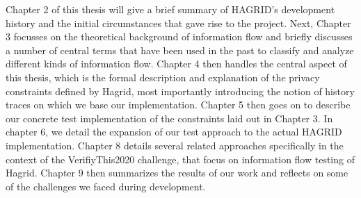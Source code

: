 Chapter 2 of this thesis will give a brief summary of HAGRID's development history and the initial circumstances that gave rise to the project. Next, Chapter 3 focusses on the theoretical background of information flow and briefly discusses a number of central terms that have been used in the past to classify and analyze different kinds of information flow.
Chapter 4 then handles the central aspect of this thesis, which is the formal description and explanation of the privacy constraints defined by Hagrid, most importantly introducing the notion of history traces on which we base our implementation. Chapter 5 then goes on to describe our concrete test implementation of the constraints laid out in Chapter 3. In chapter 6, we detail the expansion of our test approach to the actual HAGRID implementation.
Chapter 8 details several related approaches specifically in the context of the VerifiyThis2020 challenge, that focus on information flow testing of Hagrid.
Chapter 9 then summarizes the results of our work and reflects on some of the challenges we faced during development.

